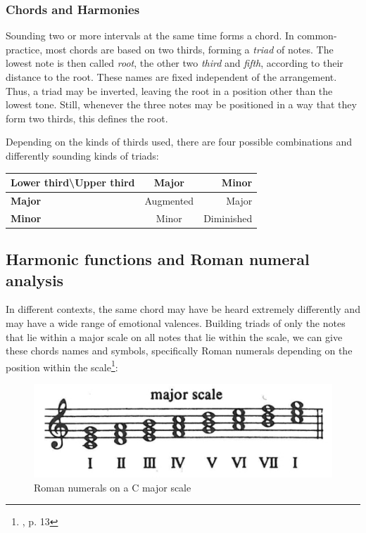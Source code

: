 \documentclass[a4paper,12pt]{report}
\begin{document}
\subsubsection{Chords and Harmonies}
Sounding two or more intervals at the same time forms a chord. In common-practice, most chords are based on two thirds, forming a \textit{triad} of notes. The lowest note is then called \textit{root}, the other two \textit{third} and \textit{fifth}, according to their distance to the root. These names are fixed independent of the arrangement. Thus, a triad may be inverted, leaving the root in a position other than the lowest tone. Still, whenever the three notes may be positioned in a way that they form two thirds, this defines the root.

Depending on the kinds of thirds used, there are four possible combinations and differently sounding kinds of triads:

\begin{center}
	\begin{tabular}{|l|c|r|}
		\hline
		\textbf{Lower third\textbackslash Upper third} & \textbf{Major} & 			\textbf{Minor}\\ \hline
		\textbf{Major} & Augmented & Major\\ \hline
		\textbf{Minor} & Minor & Diminished\\ \hline
	\end{tabular}
\end{center}

\subsection{Harmonic functions and Roman numeral analysis}
In different contexts, the same chord may have be heard extremely differently and may have a wide range of emotional valences. Building triads of only the notes that lie within a major scale on all notes that lie within the scale, we can give these chords names and symbols, specifically Roman numerals depending on the position within the scale\footnote{\cite{piston1987harmony}, p. 13}:

\begin{figure}[h]
\centering
\includegraphics[scale=0.4]{Piston_6.jpg}
\caption{Roman numerals on a C major scale}
\end{figure}
\end{document}
